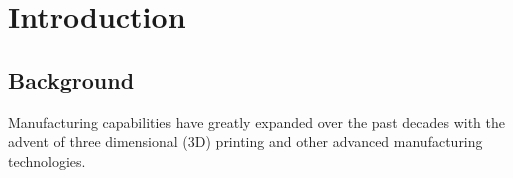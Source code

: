 \chapter{Introduction}
\label{chp:Intro}


\section{Background}

Manufacturing capabilities have greatly expanded over the past decades with the advent of three dimensional (3D) printing and other advanced manufacturing technologies. 